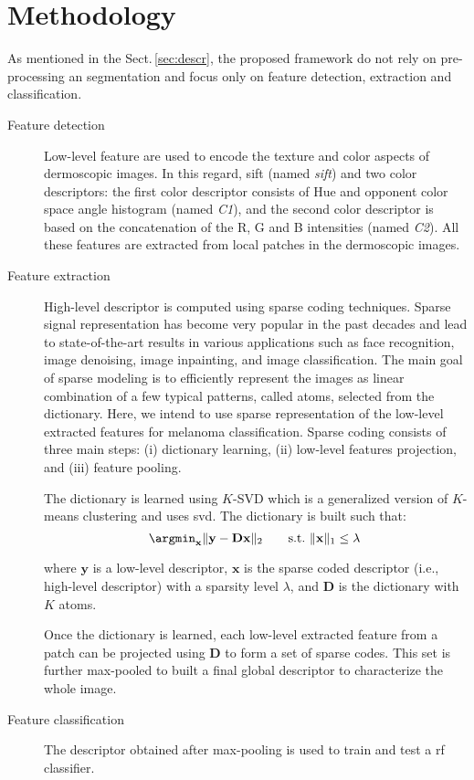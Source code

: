 \section{Methodology}
\label{sec:method}
\graphicspath{ {./content/method/figures/} }
As mentioned in the Sect.\,\ref{sec:descr}, the proposed framework do not rely on pre-processing an segmentation and focus only on feature detection, extraction and classification.
\begin{description}
\item[Feature detection] Low-level feature are used to encode the texture and color aspects of dermoscopic images. In this regard, \ac{sift} (named \emph{\ac{sift}}) and two color descriptors: the first color descriptor consists of Hue and opponent color space angle histogram (named \emph{C1}), and the second color descriptor is based on the concatenation of the R, G and B intensities (named \emph{C2}). All these features are extracted from local patches in the dermoscopic images.
\item[Feature extraction] High-level descriptor is computed using sparse coding techniques. Sparse signal representation has become very popular in the past decades and lead to state-of-the-art results in various applications such as face recognition, image denoising, image inpainting, and image classification. The main goal of sparse modeling is to efficiently represent the images as linear combination of a few typical patterns, called atoms, selected from the dictionary. Here, we intend to use sparse representation of the low-level extracted features for melanoma classification. Sparse coding consists of three main steps: (i) dictionary learning, (ii) low-level features projection, and (iii) feature pooling. 

The dictionary is learned using $K$-SVD which is a generalized version of $K$-means clustering and uses \ac{svd}. The dictionary is built such that:
\begin{equation}
  \argmin_{\mathbf{x}} \|\mathbf{y} - \mathbf{D}\mathbf{x}\|_{2} \qquad  \text{s.t.} \  \|\mathbf{x}\|_{1} \leq \lambda \,
\end{equation}

\noindent where $\mathbf{y}$ is a low-level descriptor, $\mathbf{x}$ is the sparse coded descriptor (i.e., high-level descriptor) with a sparsity level $\lambda$, and $\mathbf{D}$ is the dictionary with $K$ atoms.

Once the dictionary is learned, each low-level extracted feature from a patch can be projected using $\mathbf{D}$ to form a set of sparse codes. This set is further max-pooled to built a final global descriptor to characterize the whole image.
\item[Feature classification] The descriptor obtained after max-pooling is used to train and test a \ac{rf} classifier. 
\end{description}

